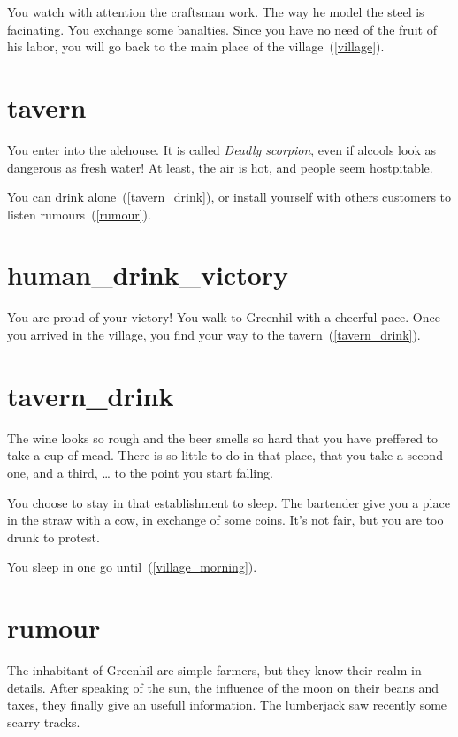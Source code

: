 You watch with attention the craftsman work. The way he model the steel is
facinating. You exchange some banalties. Since you have no need of the fruit
of his labor, you will go back to the main place of the village~(\ref{village}).

\section{tavern}

You enter into the alehouse. It is called \textit{Deadly scorpion}, even if
alcools look as dangerous as fresh water! At least, the air is hot, and people
seem hostpitable.

You can drink alone~(\ref{tavern_drink}), or install yourself with others
customers to listen rumours~(\ref{rumour}).

\section{human_drink_victory}

You are proud of your victory! You walk to Greenhil with a cheerful pace. Once
you arrived in the village, you find your way to the tavern~(\ref{tavern_drink}).

\section{tavern_drink}

The wine looks so rough and the beer smells so hard that you have preffered to
take a cup of mead. There is so little to do in that place, that you take a
second one, and a third, … to the point you start falling.

You choose to stay in that establishment to sleep. The bartender give you a place in the
straw with a cow, in exchange of some coins. It's not fair, but you are too drunk
to protest.

You sleep in one go until~(\ref{village_morning}).

\section{rumour}

The inhabitant of Greenhil are simple farmers, but they know their realm in
details. After speaking of the sun, the influence of the moon on their beans and
taxes, they finally give an usefull information. The lumberjack saw recently
some scarry tracks.

